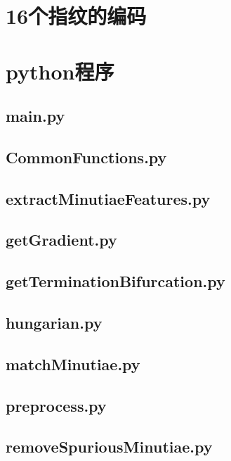 \documentclass[withoutpreface,bwprint]{cumcmthesis} %
\begin{document}
\newpage
\begin{appendices}
\section{16个指纹的编码}


\section{python程序}

\subsection{main.py}



\subsection{CommonFunctions.py}


\subsection{extractMinutiaeFeatures.py}


\subsection{getGradient.py}


\subsection{getTerminationBifurcation.py}


\subsection{hungarian.py}


\subsection{matchMinutiae.py}


\subsection{preprocess.py}


\subsection{removeSpuriousMinutiae.py}

\end{appendices}
\end{document}
